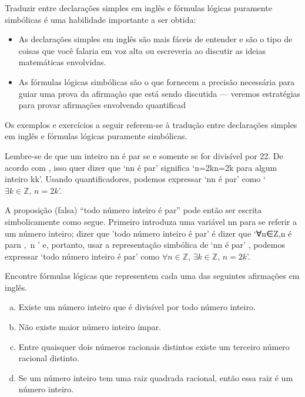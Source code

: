 Traduzir entre declarações simples em inglês e fórmulas lógicas puramente simbólicas é uma habilidade importante a ser obtida:
\begin{itemize}
\item As declarações simples em inglês são mais fáceis de entender e são o tipo de coisas que você falaria em voz alta ou escreveria ao discutir as ideias matemáticas envolvidas.
\item As fórmulas lógicas simbólicas são o que fornecem a precisão necessária para guiar uma prova da afirmação que está sendo discutida --- veremos estratégias para provar afirmações envolvendo quantificad
\end{itemize}

Os exemplos e exercícios a seguir referem-se à tradução entre declarações simples em inglês e fórmulas lógicas puramente simbólicas.
\begin{example}
Lembre-se de que um inteiro nn é par se e somente se for divisível por 22. De acordo com , isso quer dizer que `nn é par' significa `n=2kn=2k para algum inteiro kk'. Usando quantificadores, podemos expressar `nn é par' como `$\exists k \in \mathbb{Z},\, n=2k$'.

A proposição (falsa) “todo número inteiro é par” pode então ser escrita simbolicamente como segue. Primeiro introduza uma variável nn para se referir a um número inteiro; dizer que 'todo número inteiro é par' é dizer que `∀n∈Z,n é par\forall n \in {},\, n ' e, portanto, usar a representação simbólica de `nn é par' , podemos expressar `todo número inteiro é par' como $\forall n \in \mathbb{Z},\, \exists k \in \mathbb{Z},\, n=2k$'.
\end{example}

\begin{exercise}
\label{exEnglishToLogicalFormulae}
Encontre fórmulas lógicas que representem cada uma das seguintes afirmações em inglês.
\begin{enumerate}[(a)]
\item Existe um número inteiro que é divisível por todo número inteiro.
\item Não existe maior número inteiro ímpar.
\item Entre quaisquer dois números racionais distintos existe um terceiro número racional distinto.
\item Se um número inteiro tem uma raiz quadrada racional, então essa raiz é um número inteiro.
\end{enumerate}
\end{exercise}

